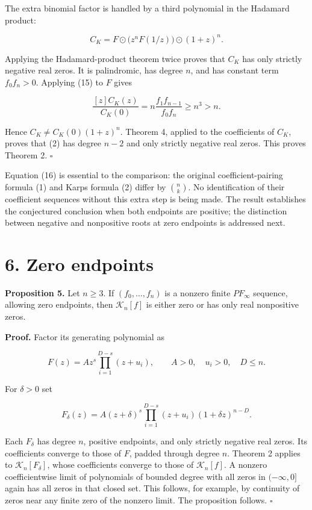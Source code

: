 \documentclass[11pt]{article}
\begin{document}
The extra binomial factor is handled by a third polynomial in the
Hadamard product:

\[
C_K=F\odot\bigl(z^nF(1/z)\bigr)\odot(1+z)^n.
\tag{16}
\]

Applying the Hadamard-product theorem twice proves that \(C_K\) has only
strictly negative real zeros. It is palindromic, has degree \(n\), and
has constant term \(f_0f_n>0\). Applying (15) to \(F\) gives

\[
\frac{[z]C_K(z)}{C_K(0)}
=n\frac{f_1f_{n-1}}{f_0f_n}\ge n^3>n.
\]

Hence \(C_K\ne C_K(0)(1+z)^n\). Theorem 4, applied to the coefficients
of \(C_K\), proves that (2) has degree \(n-2\) and only strictly
negative real zeros. This proves Theorem 2. \(\square\)

Equation (16) is essential to the comparison: the original
coefficient-pairing formula (1) and Karp\textquotesingle s formula (2)
differ by \(\binom nk\). No identification of their coefficient
sequences without this extra step is being made. The result establishes
the conjectured conclusion when both endpoints are positive; the
distinction between negative and nonpositive roots at zero endpoints is
addressed next.

\section{6. Zero endpoints}\label{zero-endpoints}

\textbf{Proposition 5.} Let \(n\ge3\). If \((f_0,\ldots,f_n)\) is a
nonzero finite \(PF_\infty\) sequence, allowing zero endpoints, then
\(\mathcal K_n[f]\) is either zero or has only real nonpositive zeros.

\textbf{Proof.} Factor its generating polynomial as

\[
F(z)=A z^s\prod_{i=1}^{D-s}(z+u_i),
\qquad A>0,\quad u_i>0,\quad D\le n.
\]

For \(\delta>0\) set

\[
F_\delta(z)=A(z+\delta)^s
\prod_{i=1}^{D-s}(z+u_i)(1+\delta z)^{n-D}.
\]

Each \(F_\delta\) has degree \(n\), positive endpoints, and only
strictly negative real zeros. Its coefficients converge to those of
\(F\), padded through degree \(n\). Theorem 2 applies to
\(\mathcal K_n[F_\delta]\), whose coefficients converge to those of
\(\mathcal K_n[f]\). A nonzero coefficientwise limit of polynomials of
bounded degree with all zeros in \((-\infty,0]\) again has all zeros in
that closed set. This follows, for example, by continuity of zeros near
any finite zero of the nonzero limit. The proposition follows.
\(\square\)
\end{document}
